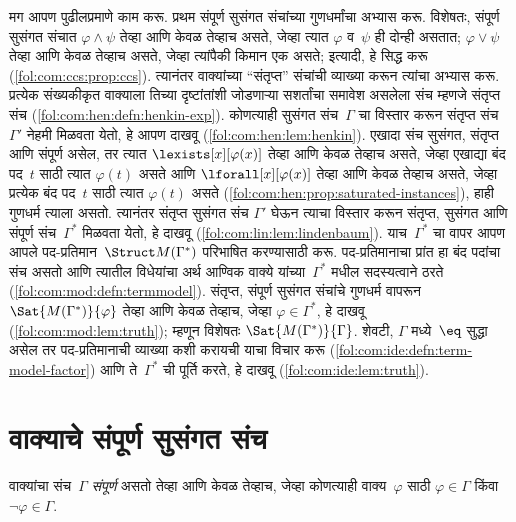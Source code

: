 मग आपण पुढीलप्रमाणे काम करू. प्रथम संपूर्ण सुसंगत संचांच्या गुणधर्मांचा
अभ्यास करू. विशेषतः, संपूर्ण सुसंगत संचात $\varphi \land \psi$ तेव्हा आणि
केवळ तेव्हाच असते, जेव्हा त्यात $\varphi$ व~$\psi$ ही दोन्ही असतात; $\varphi \lor \psi$
तेव्हा आणि केवळ तेव्हाच असते, जेव्हा त्यांपैकी किमान एक असते; इत्यादी,
हे सिद्ध करू (\ref{fol:com:ccs:prop:ccs}). त्यानंतर वाक्यांच्या
  “संतृप्त” संचांची व्याख्या करून त्यांचा अभ्यास करू. प्रत्येक संख्यकीकृत
  वाक्याला तिच्या दृष्टांतांशी जोडणाऱ्या सशर्तांचा समावेश असलेला
  संच म्हणजे संतृप्त संच (\ref{fol:com:hen:defn:henkin-exp}). कोणत्याही सुसंगत
  संच~$\Gamma$ चा विस्तार करून संतृप्त संच~$\Gamma'$ नेहमी मिळवता येतो,
  हे आपण दाखवू (\ref{fol:com:hen:lem:henkin}). एखादा संच सुसंगत, संतृप्त आणि
  संपूर्ण असेल, तर त्यात $\lexists[x][\varphi(x)]$ तेव्हा
    आणि केवळ तेव्हाच असते, जेव्हा एखाद्या बंद पद~$t$ साठी त्यात $\varphi(t)$
    असते आणि
  $\lforall[x][\varphi(x)]$ तेव्हा आणि केवळ तेव्हाच असते,
    जेव्हा प्रत्येक बंद पद~$t$ साठी त्यात $\varphi(t)$ असते
  (\ref{fol:com:hen:prop:saturated-instances}), हाही गुणधर्म त्याला असतो.
त्यानंतर संतृप्त सुसंगत संच
$\Gamma'$ घेऊन त्याचा विस्तार करून
संतृप्त, सुसंगत आणि संपूर्ण संच~$\Gamma^*$
मिळवता येतो, हे दाखवू (\ref{fol:com:lin:lem:lindenbaum}). याच~$\Gamma^*$ चा
वापर आपण आपले पद-प्रतिमान~$\Struct M(\Gamma^*)$ परिभाषित करण्यासाठी करू.
पद-प्रतिमानाचा प्रांत हा बंद पदांचा संच असतो आणि त्यातील
  विधेयांचा अर्थ आण्विक वाक्ये यांच्या~$\Gamma^*$ मधील सदस्यत्वाने ठरते
(\ref{fol:com:mod:defn:termmodel}). संतृप्त, संपूर्ण सुसंगत
संचांचे गुणधर्म वापरून
$\Sat{M(\Gamma^*)}{\varphi}$ तेव्हा आणि
केवळ तेव्हाच, जेव्हा $\varphi \in \Gamma^*$, हे दाखवू
(\ref{fol:com:mod:lem:truth}); म्हणून विशेषतः
$\Sat{M(\Gamma^*)}{\Gamma}$.
शेवटी, $\Gamma$ मध्ये~$\eq$ सुद्धा असेल तर पद-प्रतिमानाची
  व्याख्या कशी करायची याचा विचार करू
  (\ref{fol:com:ide:defn:term-model-factor}) आणि ते~$\Gamma^*$ ची पूर्ति करते,
  हे दाखवू (\ref{fol:com:ide:lem:truth}).
















\section{वाक्याचे संपूर्ण सुसंगत संच}\label{fol:com:ccs:sec}

\begin{defn}[संपूर्ण संच]
\label{fol:com:ccs:def:complete-set} वाक्यांचा संच~$\Gamma$
\emph{संपूर्ण} असतो तेव्हा आणि केवळ तेव्हाच, जेव्हा कोणत्याही
वाक्य~$\varphi$ साठी $\varphi \in \Gamma$ किंवा $\lnot \varphi \in \Gamma$.
\end{defn}

